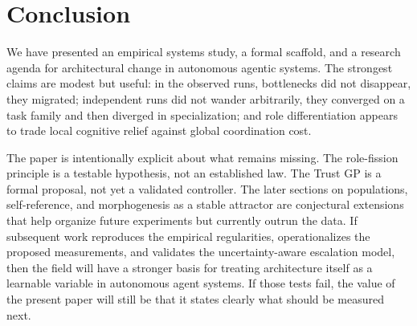 \section{Conclusion}

We have presented an empirical systems study, a formal scaffold, and a research agenda for architectural change in autonomous agentic systems. The strongest claims are modest but useful: in the observed runs, bottlenecks did not disappear, they migrated; independent runs did not wander arbitrarily, they converged on a task family and then diverged in specialization; and role differentiation appears to trade local cognitive relief against global coordination cost.

The paper is intentionally explicit about what remains missing. The role-fission principle is a testable hypothesis, not an established law. The Trust GP is a formal proposal, not yet a validated controller. The later sections on populations, self-reference, and morphogenesis as a stable attractor are conjectural extensions that help organize future experiments but currently outrun the data. If subsequent work reproduces the empirical regularities, operationalizes the proposed measurements, and validates the uncertainty-aware escalation model, then the field will have a stronger basis for treating architecture itself as a learnable variable in autonomous agent systems. If those tests fail, the value of the present paper will still be that it states clearly what should be measured next.
